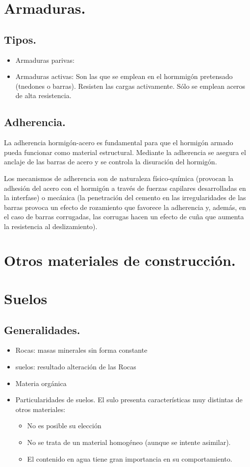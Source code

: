 \section{Armaduras.}
\subsection{Tipos.}
\begin{itemize}
    \item Armaduras parivas:
    \item Armaduras activas: Son las que se emplean en el hormmigón pretensado (tnedones o barras). Resisten las cargas activamente. Sólo se emplean aceros de alta resistencia.
\end{itemize}

\subsection{Adherencia.}
La adherencia hormigón-acero es fundamental para que el hormigón armado pueda funcionar como material estructural. Mediante la adherencia se asegura el anclaje de las barras de acero y se controla la disuración del hormigón.

Los mecanismos de adherencia son de naturaleza físico-química (provocan la adhesión del acero con el hormigón a través de fuerzas capilares desarrolladas en la interfase) o mecánica (la penetración del cemento en las irregularidades de las barras provoca un efecto de rozamiento que favorece la adherencia y, además, en el caso de barras corrugadas, las corrugas hacen un efecto de cuña que aumenta la resistencia al deslizamiento).

\section{Otros materiales de construcción.}

\section{Suelos}
\subsection{Generalidades.}
\begin{itemize}
    \item Rocas: masas minerales sin forma constante
    \item suelos: resultado alteración de las Rocas
    \item Materia orgánica
    \item Particularidades de suelos. El sulo presenta características muy distintas de otros materiales:
    \begin{itemize}
        \item No es posible su elección
        \item No se trata de un material homogéneo (aunque se intente asimilar).
        \item El contenido en agua tiene gran importancia en su comportamiento.
    \end{itemize}
\end{itemize}

